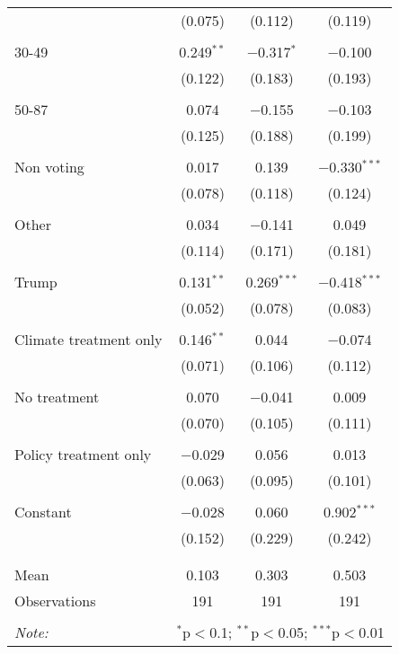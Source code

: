 \begin{tabular}{@{\extracolsep{5pt}}lccc}
  & (0.075) & (0.112) & (0.119) \\ 
  & & & \\ 
 30-49 & 0.249$^{**}$ & $-$0.317$^{*}$ & $-$0.100 \\ 
  & (0.122) & (0.183) & (0.193) \\ 
  & & & \\ 
 50-87 & 0.074 & $-$0.155 & $-$0.103 \\ 
  & (0.125) & (0.188) & (0.199) \\ 
  & & & \\ 
 Non voting & 0.017 & 0.139 & $-$0.330$^{***}$ \\ 
  & (0.078) & (0.118) & (0.124) \\ 
  & & & \\ 
 Other & 0.034 & $-$0.141 & 0.049 \\ 
  & (0.114) & (0.171) & (0.181) \\ 
  & & & \\ 
 Trump & 0.131$^{**}$ & 0.269$^{***}$ & $-$0.418$^{***}$ \\ 
  & (0.052) & (0.078) & (0.083) \\ 
  & & & \\ 
 Climate treatment only & 0.146$^{**}$ & 0.044 & $-$0.074 \\ 
  & (0.071) & (0.106) & (0.112) \\ 
  & & & \\ 
 No treatment & 0.070 & $-$0.041 & 0.009 \\ 
  & (0.070) & (0.105) & (0.111) \\ 
  & & & \\ 
 Policy treatment only & $-$0.029 & 0.056 & 0.013 \\ 
  & (0.063) & (0.095) & (0.101) \\ 
  & & & \\ 
 Constant & $-$0.028 & 0.060 & 0.902$^{***}$ \\ 
  & (0.152) & (0.229) & (0.242) \\ 
  & & & \\ 
\hline \\[-1.8ex] 
Mean & 0.103 & 0.303 & 0.503 \\ 
Observations & 191 & 191 & 191 \\ 
\hline 
\hline \\[-1.8ex] 
\textit{Note:}  & \multicolumn{3}{r}{$^{*}$p$<$0.1; $^{**}$p$<$0.05; $^{***}$p$<$0.01} \\ 
\end{tabular} 
